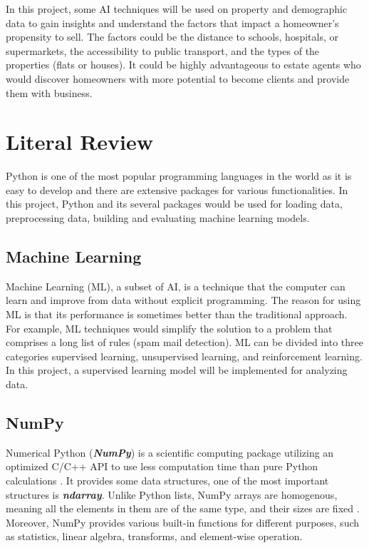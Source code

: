 \documentclass[12pt,twoside]{report}
\begin{document}
In this project, some AI techniques will be used on property and demographic data to gain insights and understand the factors that impact a homeowner's propensity to sell. The factors could be the distance to schools, hospitals, or supermarkets, the accessibility to public transport, and the types of the properties (flats or houses). It could be highly advantageous to estate agents who would discover homeowners with more potential to become clients and provide them with business. 

\chapter{Literal Review}
Python is one of the most popular programming languages in the world as it is easy to develop and there are extensive packages for various functionalities. In this project, Python and its several packages would be used for loading data, preprocessing data, building and evaluating machine learning models. 

\section{Machine Learning}
Machine Learning (ML), a subset of AI, is a technique that the computer can learn and improve from data without explicit programming. The reason for using ML is that its performance is sometimes better than the traditional approach. For example, ML techniques would simplify the solution to a problem that comprises a long list of rules (spam mail detection). ML can be divided into three categories supervised learning, unsupervised learning, and reinforcement learning. In this project, a supervised learning model will be implemented for analyzing data.

\section{NumPy}
Numerical Python (\textit{\textbf{NumPy}}) is a scientific computing package utilizing an optimized C/C++ API to use less computation time than pure Python calculations \citep{RN6}. It provides some data structures, one of the most important structures is \textbf{\emph{ndarray}}. Unlike Python lists, NumPy arrays are homogenous, meaning all the elements in them are of the same type, and their sizes are fixed \citep{RN4}.  Moreover, NumPy provides various built-in functions for different purposes, such as statistics, linear algebra,  transforms, and element-wise operation. 
\\
\end{document}
